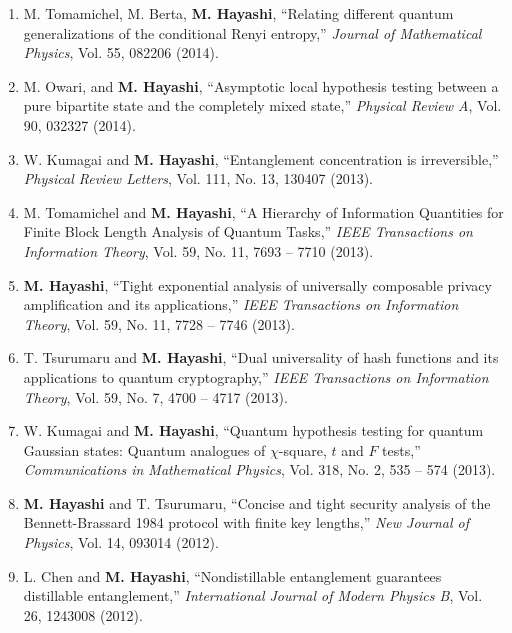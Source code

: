 \documentclass[a4paper,12pt,oneside]{article}
\begin{document}
\begin{enumerate}
\item 
M. Tomamichel, M. Berta, \textbf{M. Hayashi},
``Relating different quantum generalizations of the conditional
Renyi entropy,'' 
{\em Journal of Mathematical Physics}, Vol. 55, 082206 (2014).

\item 
M. Owari, and \textbf{M. Hayashi},
``Asymptotic local hypothesis testing between a pure bipartite state and the
completely mixed state,''
{\em Physical Review A}, Vol. 90, 032327 (2014).

\item W. Kumagai and \textbf{M. Hayashi}, 
``Entanglement concentration is irreversible,''
{\em Physical Review Letters}, Vol. 111, No. 13, 130407 (2013).

\item M. Tomamichel and \textbf{M. Hayashi}, 
``A Hierarchy of Information Quantities for Finite Block Length Analysis of Quantum Tasks,''
{\em IEEE Transactions on Information Theory},
 Vol. 59,  No. 11, 7693 -- 7710 (2013).

\item 
\textbf{M. Hayashi}, 
``Tight exponential analysis of universally composable privacy amplification and its applications,''
{\em IEEE Transactions on Information Theory},
 Vol. 59,  No. 11, 7728 -- 7746 (2013).

\item T. Tsurumaru and \textbf{M. Hayashi}, 
``Dual universality of hash functions and its applications to quantum cryptography,''
{\em IEEE Transactions on Information Theory},
Vol. 59, No. 7, 4700 -- 4717 (2013). 

\item W. Kumagai and \textbf{M. Hayashi}, 
``Quantum hypothesis testing for quantum Gaussian states: Quantum analogues of $\chi$-square, $t$ and $F$ tests,''  {\em Communications in Mathematical Physics}, Vol. 318, No. 2, 535 -- 574 (2013). 

\item \textbf{M. Hayashi} and T. Tsurumaru, 
``Concise and tight security analysis of the Bennett-Brassard 1984 protocol with finite key lengths,'' 
{\em New Journal of Physics}, Vol. 14, 093014 (2012).

\item L. Chen and \textbf{M. Hayashi}, 
``Nondistillable entanglement guarantees distillable entanglement,''
{\em International Journal of Modern Physics B}, Vol. 26, 1243008 (2012).


\end{enumerate}
\end{document}
